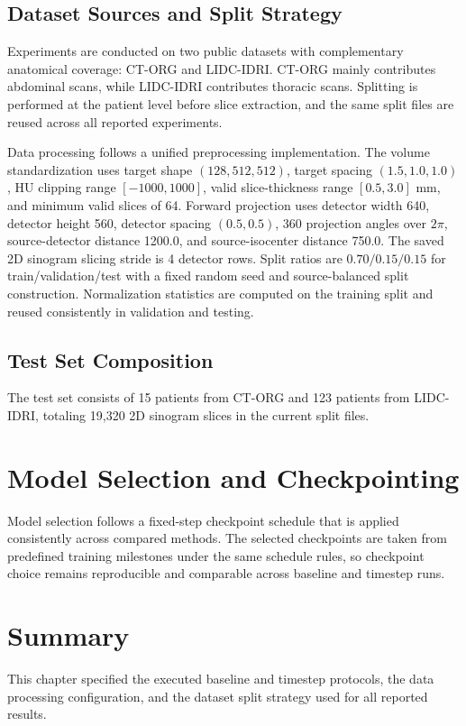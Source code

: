 \subsection{Dataset Sources and Split Strategy}

Experiments are conducted on two public datasets with complementary anatomical coverage: CT-ORG and LIDC-IDRI. CT-ORG mainly contributes abdominal scans, while LIDC-IDRI contributes thoracic scans. Splitting is performed at the patient level before slice extraction, and the same split files are reused across all reported experiments.

Data processing follows a unified preprocessing implementation. The volume standardization uses target shape \((128,512,512)\), target spacing \((1.5,1.0,1.0)\), HU clipping range \([-1000,1000]\), valid slice-thickness range \([0.5,3.0]\) mm, and minimum valid slices of 64. Forward projection uses detector width 640, detector height 560, detector spacing \((0.5,0.5)\), 360 projection angles over \(2\pi\), source-detector distance 1200.0, and source-isocenter distance 750.0. The saved 2D sinogram slicing stride is 4 detector rows. Split ratios are \(0.70/0.15/0.15\) for train/validation/test with a fixed random seed and source-balanced split construction. Normalization statistics are computed on the training split and reused consistently in validation and testing.

\subsection{Test Set Composition}

The test set consists of 15 patients from CT-ORG and 123 patients from LIDC-IDRI, totaling 19,320 2D sinogram slices in the current split files.

\section{Model Selection and Checkpointing}

Model selection follows a fixed-step checkpoint schedule that is applied consistently across compared methods. The selected checkpoints are taken from predefined training milestones under the same schedule rules, so checkpoint choice remains reproducible and comparable across baseline and timestep runs.

\section{Summary}

This chapter specified the executed baseline and timestep protocols, the data processing configuration, and the dataset split strategy used for all reported results.
